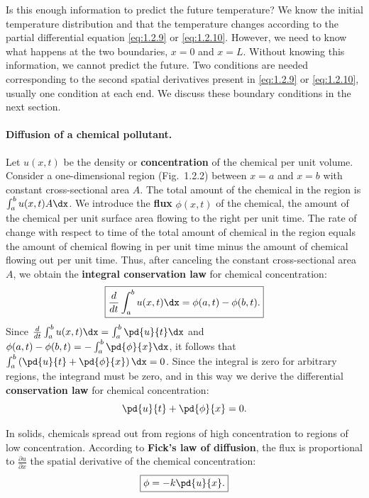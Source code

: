 Is this enough information to predict the future temperature? We know the initial temperature distribution and that the temperature changes according to the partial differential equation \eqref{eq:1.2.9} or \eqref{eq:1.2.10}. However, we need to know what happens at the two boundaries, $x = 0$ and $x = L$. Without knowing this information, we cannot predict the future. Two conditions are needed corresponding to the second spatial derivatives present in \eqref{eq:1.2.9} or \eqref{eq:1.2.10}, usually one condition at each end. We discuss these boundary conditions in the next section.

\paragraph{Diffusion of a chemical pollutant.}
Let $u(x,t)$ be the density or \textbf{concentration} of the chemical per unit volume. Consider a one-dimensional region (Fig.~1.2.2) between $x = a$ and $x = b$ with constant cross-sectional area $A$. The total amount of the chemical in the region is $\int_a^b u(x,t) A\dx$. We introduce the \textbf{flux} $\phi(x,t)$ of the chemical, the amount of the chemical per unit surface area flowing to the right per unit time. The rate of change with respect to time of the total amount of chemical in the region equals the amount of chemical flowing in per unit time minus the amount of chemical flowing out per unit time. Thus, after canceling the constant cross-sectional area $A$, we obtain the \textbf{integral conservation law} for chemical concentration:
\begin{equation}
\boxed{\frac{d}{d t}\int_a^b u(x,t)\dx = \phi(a,t) - \phi(b,t).}
\label{eq:1.2.11}
\end{equation}
Since $\frac{d}{dt}\int_a^b u(x,t)\dx = \int_a^b \pd{u}{t}\dx$ and $\phi(a,t) - \phi(b,t) = -\int_a^b \pd{\phi}{x}\dx$, it follows that $\int_a^b \left(\pd{u}{t} + \pd{\phi}{x}\right)\dx = 0$. Since the integral is zero for arbitrary regions, the integrand must be zero, and in this way we derive the differential \textbf{conservation law} for chemical concentration:
\begin{equation}
\pd{u}{t} + \pd{\phi}{x} = 0.
\label{eq:1.2.12}
\end{equation}

In solids, chemicals spread out from regions of high concentration to regions of low concentration. According to \textbf{Fick's law of diffusion}, the flux is proportional to $\frac{\partial u}{\partial x}$ the spatial derivative of the chemical concentration:
\begin{equation}
\boxed{\phi = -k\pd{u}{x}.}
\label{eq:1.2.13}
\end{equation}

